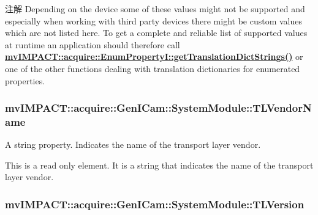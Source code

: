 \begin{DoxyNote}{注解}
Depending on the device some of these values might not be supported and especially when working with third party devices there might be custom values which are not listed here. To get a complete and reliable list of supported values at runtime an application should therefore call {\bfseries \hyperlink{classmv_i_m_p_a_c_t_1_1acquire_1_1_enum_property_i_a0ba6ccbf5ee69784d5d0b537924d26b6}{mv\+I\+M\+P\+A\+C\+T\+::acquire\+::\+Enum\+Property\+I\+::get\+Translation\+Dict\+Strings()}} or one of the other functions dealing with translation dictionaries for enumerated properties. 
\end{DoxyNote}
\hypertarget{classmv_i_m_p_a_c_t_1_1acquire_1_1_gen_i_cam_1_1_system_module_a4b14d0aa202e4a6f813f8fc8e6cc11b6}{
\subsubsection[{T\+L\+Vendor\+Name}]{ mv\+I\+M\+P\+A\+C\+T\+::acquire\+::\+Gen\+I\+Cam\+::\+System\+Module\+::\+T\+L\+Vendor\+Name}}\label{classmv_i_m_p_a_c_t_1_1acquire_1_1_gen_i_cam_1_1_system_module_a4b14d0aa202e4a6f813f8fc8e6cc11b6}


A string property. Indicates the name of the transport layer vendor. 

This is a read only element. It is a string that indicates the name of the transport layer vendor. \hypertarget{classmv_i_m_p_a_c_t_1_1acquire_1_1_gen_i_cam_1_1_system_module_a876fa426180d3e60e2d600dd1e5ab6d2}{
\subsubsection[{T\+L\+Version}]{ mv\+I\+M\+P\+A\+C\+T\+::acquire\+::\+Gen\+I\+Cam\+::\+System\+Module\+::\+T\+L\+Version}}\label{classmv_i_m_p_a_c_t_1_1acquire_1_1_gen_i_cam_1_1_system_module_a876fa426180d3e60e2d600dd1e5ab6d2}


